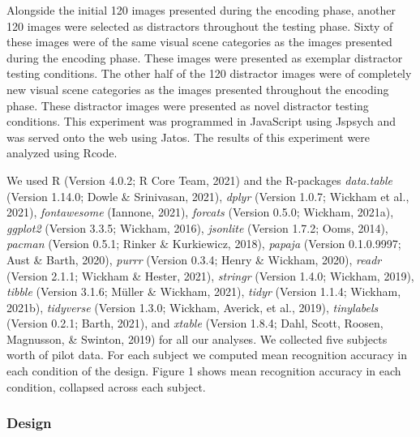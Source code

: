 \documentclass[
  english,
  man,floatsintext]{apa6}
\begin{document}
Alongside the initial 120 images presented during the encoding phase, another 120 images were selected as distractors throughout the testing phase. Sixty of these images were of the same visual scene categories as the images presented during the encoding phase. These images were presented as exemplar distractor testing conditions. The other half of the 120 distractor images were of completely new visual scene categories as the images presented throughout the encoding phase. These distractor images were presented as novel distractor testing conditions. This experiment was programmed in JavaScript using Jspsych and was served onto the web using Jatos. The results of this experiment were analyzed using Rcode.

We used R (Version 4.0.2; R Core Team, 2021) and the R-packages \emph{data.table} (Version 1.14.0; Dowle \& Srinivasan, 2021), \emph{dplyr} (Version 1.0.7; Wickham et al., 2021), \emph{fontawesome} (Iannone, 2021), \emph{forcats} (Version 0.5.0; Wickham, 2021a), \emph{ggplot2} (Version 3.3.5; Wickham, 2016), \emph{jsonlite} (Version 1.7.2; Ooms, 2014), \emph{pacman} (Version 0.5.1; Rinker \& Kurkiewicz, 2018), \emph{papaja} (Version 0.1.0.9997; Aust \& Barth, 2020), \emph{purrr} (Version 0.3.4; Henry \& Wickham, 2020), \emph{readr} (Version 2.1.1; Wickham \& Hester, 2021), \emph{stringr} (Version 1.4.0; Wickham, 2019), \emph{tibble} (Version 3.1.6; Müller \& Wickham, 2021), \emph{tidyr} (Version 1.1.4; Wickham, 2021b), \emph{tidyverse} (Version 1.3.0; Wickham, Averick, et al., 2019), \emph{tinylabels} (Version 0.2.1; Barth, 2021), and \emph{xtable} (Version 1.8.4; Dahl, Scott, Roosen, Magnusson, \& Swinton, 2019) for all our analyses. We collected five subjects worth of pilot data. For each subject we computed mean recognition accuracy in each condition of the design. Figure 1 shows mean recognition accuracy in each condition, collapsed across each subject.

\hypertarget{design}{%
\subsubsection{Design}\label{design}}
\end{document}
